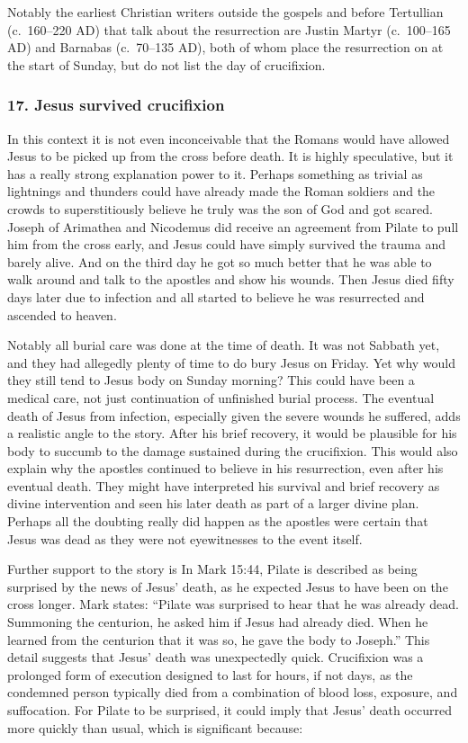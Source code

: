 Notably the earliest Christian writers outside the gospels and before Tertullian (c.~160--220 AD) that talk about the resurrection are Justin Martyr (c.~100--165 AD) and Barnabas (c.~70--135 AD), both of whom place the resurrection on at the start of Sunday, but do not list the day of crucifixion.

\subsubsection{17.
Jesus survived crucifixion}\label{par:sec:jesus-survived-crucifixion}

In this context it is not even inconceivable that the Romans would have allowed Jesus to be picked up from the cross before death.
It is highly speculative, but it has a really strong explanation power to it.
Perhaps something as trivial as lightnings and thunders could have already made the Roman soldiers and the crowds to superstitiously believe he truly was the son of God and got scared.
Joseph of Arimathea and Nicodemus did receive an agreement from Pilate to pull him from the cross early, and Jesus could have simply survived the trauma and barely alive.
And on the third day he got so much better that he was able to walk around and talk to the apostles and show his wounds.
Then Jesus died fifty days later due to infection and all started to believe he was resurrected and ascended to heaven.

Notably all burial care was done at the time of death.
It was not Sabbath yet, and they had allegedly plenty of time to do bury Jesus on Friday.
Yet why would they still tend to Jesus body on Sunday morning?
This could have been a medical care, not just continuation of unfinished burial process.
The eventual death of Jesus from infection, especially given the severe wounds he suffered, adds a realistic angle to the story.
After his brief recovery, it would be plausible for his body to succumb to the damage sustained during the crucifixion.
This would also explain why the apostles continued to believe in his resurrection, even after his eventual death.
They might have interpreted his survival and brief recovery as divine intervention and seen his later death as part of a larger divine plan.
Perhaps all the doubting really did happen as the apostles were certain that Jesus was dead as they were not eyewitnesses to the event itself.

Further support to the story is In Mark 15:44, Pilate is described as being surprised by the news of Jesus' death, as he expected Jesus to have been on the cross longer.
Mark states: ``Pilate was surprised to hear that he was already dead.
Summoning the centurion, he asked him if Jesus had already died.
When he learned from the centurion that it was so, he gave the body to Joseph.'' This detail suggests that Jesus' death was unexpectedly quick.
Crucifixion was a prolonged form of execution designed to last for hours, if not days, as the condemned person typically died from a combination of blood loss, exposure, and suffocation.
For Pilate to be surprised, it could imply that Jesus' death occurred more quickly than usual, which is significant because:

